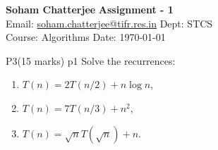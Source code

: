 \documentclass[a4paper, 11pt]{article}
\begin{document}
	
	
	\textsf{\noindent \large\textbf{Soham Chatterjee} \hfill \textbf{Assignment - 1}\\
		Email: \href{soham.chatterjee@tifr.res.in}{soham.chatterjee@tifr.res.in} \hfill Dept: STCS\\
		\normalsize Course: Algorithms \hfill Date: \today}
	
	
\begin{problem}{%
		P3\hfill  (15 marks)
	}{p1%
}
Solve the recurrences: \begin{enumerate}[label=(\roman*)]
	\item $T(n)=2 T(n / 2)+n \log n$, 
	\item $T(n)=7 T(n / 3)+n^2$, 
	\item $T(n)=\sqrt{n} T(\sqrt{n})+n$.
\end{enumerate}

\end{problem}
\end{document}
